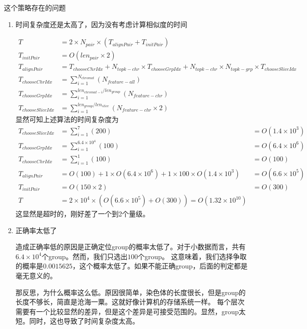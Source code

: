 \documentclass[hyperref,UTF8]{ctexart}
\theoremstyle{definition}
\theoremstyle{remark}
\numberwithin{equation}{subsection}
\begin{document}
	这个策略存在的问题
	\begin{enumerate}	
		
		\item 时间复杂度还是太高了，因为没有考虑计算相似度的时间

		\begin{align*}
			T &= 2 \times N_{pair} \times ( T_{alignPair} + T_{initPair} )	\\
			T_{initPair} &= O(len_{pair} \times 2) \\
			T_{alignPair} &= T_{chooseChrIdx} + N_{topk-chr} \times T_{chooseGrpIdx} + N_{topk-chr} \times N_{topk-grp} \times T_{chooseSliceIdx}	\\
			T_{chooseChrIdx} &= \sum_{i=1}^{N_{chromat}} (N_{feature-all})	\\
			T_{chooseGrpIdx} &= \sum_{i=1}^{len_{chromat-i} / len_{group}} (N_{feature-chr}) \\
			T_{chooseSliceIdx} &= \sum_{i=1}^{len_{group} / len_{slice}} (N_{feature-chr} \times 2)
		\end{align*}
		显然可知上述算法的时间复杂度为
		\begin{align*}
			T_{chooseSliceIdx} &= \sum_{i=1}^{7} (200) &= O(1.4 \times 10^3)	\\
			T_{chooseGrpIdx} &= \sum_{i=1}^{6.4 \times 10^4} (100) &= O(6.4 \times 10^6) \\
			T_{chooseChrIdx} &= \sum_{i=1}^{1} (100) &= O(100) \\
			T_{alignPair} &= O(100) + 1 \times O(6.4 \times 10^6) + 1 \times 100 \times O(1.4 \times 10^3) &= O(6.6 \times 10^5) \\
			T_{initPair} &= O(150 \times 2) &= O(300) \\
			T &= 2 \times 10^4 \times (O(6.6 \times 10^5) + O(300)) = O(1.32 \times 10^10)
		\end{align*}
		这显然是超时的，刚好差了一个到2个量级。

		\item 正确率太低了

		造成正确率低的原因是正确定位group的概率太低了。对于小数据而言，共有$6.4 \times 10^4$个group。然而，我们只选出$100$个group。
		这意味着，我们选择争取的概率是$0.0015625$，这个概率太低了。如果不能正确group，后面的判定都是毫无意义的。

		那反思，为什么概率这么低。原因很简单，染色体的长度很长，但是group的长度不够长，简直是沧海一粟。这就好像计算机的存储系统一样。
		每个层次需要有一个比较显然的差异，但是这个差异是可接受范围的。显然，group太短。同时，这也导致了时间复杂度太高。


\end{enumerate}
\end{document}
